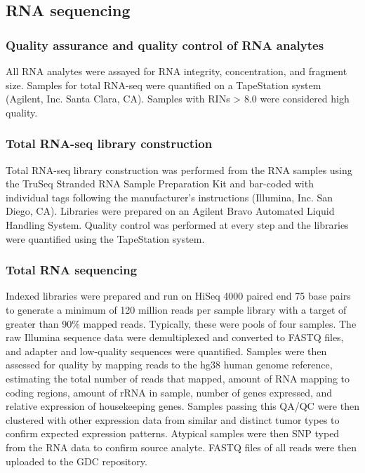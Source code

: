 \subsection{RNA sequencing}

\subsubsection{Quality assurance and quality control of RNA analytes}
All RNA analytes were assayed for RNA integrity, concentration, and fragment size. Samples for total RNA-seq were quantified on a TapeStation system (Agilent, Inc. Santa Clara, CA). Samples with RINs > 8.0 were considered high quality.

\subsubsection{Total RNA-seq library construction}
Total RNA-seq library construction was performed from the RNA samples using the TruSeq Stranded RNA Sample Preparation Kit and bar-coded with individual tags following the manufacturer’s instructions (Illumina, Inc. San Diego, CA). Libraries were prepared on an Agilent Bravo Automated Liquid Handling System. Quality control was performed at every step and the libraries were quantified using the TapeStation system.

\subsubsection{Total RNA sequencing}
Indexed libraries were prepared and run on HiSeq 4000 paired end 75 base pairs to generate a minimum of 120 million reads per sample library with a target of greater than 90\% mapped reads. Typically, these were pools of four samples. The raw Illumina sequence data were demultiplexed and converted to FASTQ files, and adapter and low-quality sequences were quantified. Samples were then assessed for quality by mapping reads to the hg38 human genome reference, estimating the total number of reads that mapped, amount of RNA mapping to coding regions, amount of rRNA in sample, number of genes expressed, and relative expression of housekeeping genes. Samples passing this QA/QC were then clustered with other expression data from similar and distinct tumor types to confirm expected expression patterns. Atypical samples were then SNP typed from the RNA data to confirm source analyte. FASTQ files of all reads were then uploaded to the GDC repository.

